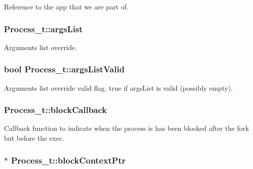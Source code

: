 Reference to the app that we are part of. 

\subsubsection[{\texorpdfstring{args\+List}{argsList}}]{ Process\+\_\+t\+::args\+List}\hypertarget{struct_process__t_a496d07b1ced8331f7bbe196550c7afec}{}\label{struct_process__t_a496d07b1ced8331f7bbe196550c7afec}


Arguments list override. 

\subsubsection[{\texorpdfstring{args\+List\+Valid}{argsListValid}}]{\setlength{\rightskip}{0pt plus 5cm}bool Process\+\_\+t\+::args\+List\+Valid}\hypertarget{struct_process__t_a30c933c132f6793c5ff7787acd795359}{}\label{struct_process__t_a30c933c132f6793c5ff7787acd795359}
Arguments list override valid flag. true if args\+List is valid (possibly empty). 
\subsubsection[{\texorpdfstring{block\+Callback}{blockCallback}}]{ Process\+\_\+t\+::block\+Callback}\hypertarget{struct_process__t_afd5bad905256649315e9a1dd2c3e5dc2}{}\label{struct_process__t_afd5bad905256649315e9a1dd2c3e5dc2}
Callback function to indicate when the process is has been blocked after the fork but before the exec. 
\subsubsection[{\texorpdfstring{block\+Context\+Ptr}{blockContextPtr}}]{$\ast$ Process\+\_\+t\+::block\+Context\+Ptr}\hypertarget{struct_process__t_aab380c27314db4d94f8212db22ae4472}{}\label{struct_process__t_aab380c27314db4d94f8212db22ae4472}


